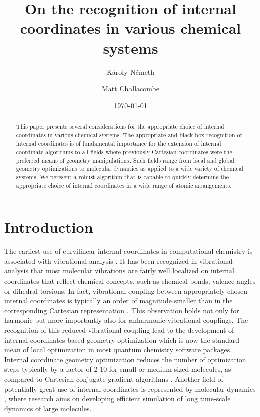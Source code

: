 \documentclass[prl,aps,preprint,superbib,12pt]{revtex4}
\begin{document}
\title{On the recognition of internal coordinates in various 
chemical systems}

\author{K\'aroly N\'emeth\footnotemark[1]}
\author{Matt Challacombe}


\date{\today}

\begin{abstract}
This paper presents several considerations for the appropriate choice 
of internal coordinates in various chemical systems. The appropriate
and black box recognition of internal coordinates is of fundamental 
importance
for the extension of internal coordinate algorithms to all fields where
previously Cartesian coordinates were the preferred means of geometry 
manipulations. Such fields range from local and global geometry 
optimizations to molecular dynamics as applied to a wide variety of
chemical systems. We peresent a robust algorithm that is capable 
to quickly determine the appropriate choice of internal coordinates
in a wide range of atomic arrangements.
\end{abstract}


\maketitle


\section{Introduction}
The earliest use of curvilinear internal coordinates 
in computational chemistry
is associated with vibrational analysis \cite{EWilson55}. 
It has been recognized in vibrational analysis 
that most molecular vibrations
are fairly well localized on internal coordinates that reflect
chemical concepts, such as chemical bonds, valence angles or
dihedral torsions. In fact, vibrational coupling between
appropriately chosen internal coordinates is typically
an order of magnitude smaller than in the corresponding Cartesian
representation \cite{PPulay69,GFogarasi79,GFogarasi92,PPulay77}.
This observation holds not only for harmonic but more importantly
also for anharmonic vibrational couplings.
The recognition of this reduced vibrational coupling lead to the
development of internal coordinates based geometry optimization
\cite{PPulay69,PPulay77,GFogarasi79,HSchlegel82,HSchlegel03} which
is now the standard mean of local optimization in most quantum
chemistry software packages. Internal coordinate geometry optimization
reduces the number of optimization steps typically by a factor of 2-10
for small or medium sized molecules, as compared to Cartesian
conjugate gradient algorithms \cite{TBucko05}. Another field of
potentially great use of internal coordinates is represented
by molecular dynamics \cite{PPulay02}, where research aims on developing
efficient simulation of long time-scale dynamics of large molecules.
\end{document}
